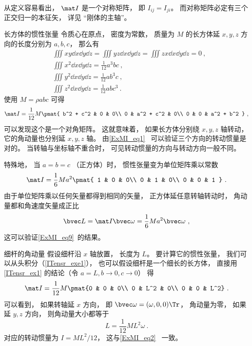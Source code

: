 从定义容易看出， $\mat I$ 是一个对称矩阵， 即 $I_{ij} = I_{ji}$。 而对称矩阵必定有三个正交归一的本征矢， 详见 “刚体的主轴”。

\begin{example}{长方体的惯性张量}\label{ITensr_ex1}
令质心在原点， 密度为常数， 质量为 $M$ 的长方体延 $x, y, z$ 方向的长度分别为 $a, b, c$， 那么有
\begin{equation}
\begin{aligned}
&\iiint xy \dd{x}\dd{y}\dd{z} = \iiint yz \dd{x}\dd{y}\dd{z} = \iiint zx \dd{x}\dd{y}\dd{z} = 0~,\\
&\iiint x^2 \dd{x}\dd{y}\dd{z} = \frac{1}{12} a^3 bc~,\\
&\iiint y^2 \dd{x}\dd{y}\dd{z} = \frac{1}{12} ab^3 c~,\\
&\iiint z^2 \dd{x}\dd{y}\dd{z} = \frac{1}{12} ab c^3~.
\end{aligned}
\end{equation}
使用 $M = \rho abc$ 可得
\begin{equation}\label{ITensr_eq4}
\mat I = \frac{1}{12} M
\pmat{
   b^2 + c^2 & 0 & 0\\
   0 & a^2 + c^2 & 0\\
   0 & 0 & a^2 + b^2
}~,
\end{equation}
可以发现这个是一个对角矩阵。 这就意味着， 如果长方体分别绕 $x, y, z$ 轴转动， 它的角动量也分别延 $x, y, z$ 轴。 由\autoref{ExMI_eq1}~ 可以验证三个方向的转动惯量是对的。 当转轴与坐标轴不重合时， 可见转动惯量的方向与转动方向一般不同。

特殊地， 当 $a = b = c$ （正方体）时， 惯性张量变为单位矩阵乘以常数
\begin{equation}
\mat I = \frac{1}{6} Ma^2
\pmat{
   1 & 0 & 0\\
   0 & 1 & 0\\
   0 & 0 & 1
}~.
\end{equation}
由于单位矩阵乘以任何矢量都得到相同的矢量， 正方体延任意转轴转动时， 角动量都和角速度矢量成正比
\begin{equation}
\bvec L = \mat I \bvec \omega = \frac{1}{6} Ma^2 \bvec \omega~,
\end{equation}
这可以验证\autoref{ExMI_eq9}~的结果。
\end{example}

\begin{example}{细杆的角动量}
假设细杆沿 $x$ 轴放置， 长度为 $L$。 要计算它的惯性张量， 我们可以从头积分（\autoref{ITensr_exe1}）， 也可以假设细杆是一个细长的长方体， 直接用\autoref{ITensr_ex1} 的结论（令 $a = L, b \to 0, c \to 0$） 得
\begin{equation}\label{ITensr_eq5}
\mat I = \frac{1}{12} M \pmat{0 & 0 & 0\\ 0 & L^2 & 0\\ 0 & 0 & L^2}~.
\end{equation}
可以看到， 如果转轴延 $x$ 方向， 即 $\bvec\omega = (\omega, 0, 0)\Tr$， 角动量为零， 如果延 $y, z$ 方向， 则角动量大小都等于
\begin{equation}
L = \frac{1}{12} M L^2 \omega~.
\end{equation}
对应的转动惯量为 $I = ML^2/12$， 这与\autoref{ExMI_eq2}~ 一致。
\end{example}

